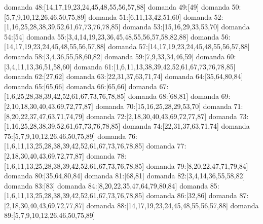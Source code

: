 domanda 48:[14,17,19,23,24,45,48,55,56,57,88]
domanda 49:[49]
domanda 50:[5,7,9,10,12,26,46,50,75,89]
domanda 51:[6,11,13,42,51,60]
domanda 52:[1,16,25,28,38,39,52,61,67,73,76,78,85]
domanda 53:[15,16,29,33,53,70]
domanda 54:[54]
domanda 55:[3,4,14,19,23,36,45,48,55,56,57,58,82,88]
domanda 56:[14,17,19,23,24,45,48,55,56,57,88]
domanda 57:[14,17,19,23,24,45,48,55,56,57,88]
domanda 58:[3,4,36,55,58,60,82]
domanda 59:[7,9,33,34,46,59]
domanda 60:[3,4,11,13,36,51,58,60]
domanda 61:[1,6,11,13,38,39,42,52,61,67,73,76,78,85]
domanda 62:[27,62]
domanda 63:[22,31,37,63,71,74]
domanda 64:[35,64,80,84]
domanda 65:[65,66]
domanda 66:[65,66]
domanda 67:[1,6,25,28,38,39,42,52,61,67,73,76,78,85]
domanda 68:[68,81]
domanda 69:[2,10,18,30,40,43,69,72,77,87]
domanda 70:[15,16,25,28,29,53,70]
domanda 71:[8,20,22,37,47,63,71,74,79]
domanda 72:[2,18,30,40,43,69,72,77,87]
domanda 73:[1,16,25,28,38,39,52,61,67,73,76,78,85]
domanda 74:[22,31,37,63,71,74]
domanda 75:[5,7,9,10,12,26,46,50,75,89]
domanda 76:[1,6,11,13,25,28,38,39,42,52,61,67,73,76,78,85]
domanda 77:[2,18,30,40,43,69,72,77,87]
domanda 78:[1,6,11,13,25,28,38,39,42,52,61,67,73,76,78,85]
domanda 79:[8,20,22,47,71,79,84]
domanda 80:[35,64,80,84]
domanda 81:[68,81]
domanda 82:[3,4,14,36,55,58,82]
domanda 83:[83]
domanda 84:[8,20,22,35,47,64,79,80,84]
domanda 85:[1,6,11,13,25,28,38,39,42,52,61,67,73,76,78,85]
domanda 86:[32,86]
domanda 87:[2,18,30,40,43,69,72,77,87]
domanda 88:[14,17,19,23,24,45,48,55,56,57,88]
domanda 89:[5,7,9,10,12,26,46,50,75,89]

